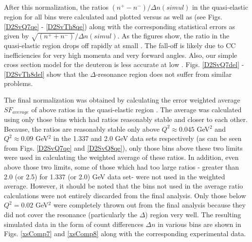 After this normalization, the ratios $(n^+ - n^-)/\Delta n(simul)$ in the quasi-elastic region for all \qsqs %
bins were calculated and plotted versus \qsqs as well as \ths %
(see Figs. \ref{D2SvQ7qe} - \ref{D2SvTh8qe})
along with the corresponding statistical errors as given by $\sqrt{(n^+ + n^-)}/\Delta n(simul)$. As the figures show, the ratio in the quasi-elastic region drops %
off rapidly at small \qsq. The fall-off is likely due to CC inefficiencies for very high momenta and very forward angles. Also, our simple cross section model for the deuteron is less accurate at low \qsq.  Figs. \ref{D2SvQ7del} - \ref{D2SvTh8del} show that the $\Delta$-resonance region does not suffer from similar problems. %


The final normalization was obtained by calculating the error weighted average $SF_{average}$ of above ratios in the quasi-elastic region%
. %
The average was calculated using only those \qsqs bins which had ratios reasonably stable and closer to each other. %
Because, the ratios are reasonably stable only above $Q^2\approx 0.045$ GeV$^2$ and $Q^2 \approx 0.09$ GeV$^2$ in the 1.337 and 2.0 GeV data sets respectively (as can be seen from Figs. \ref{D2SvQ7qe} and \ref{D2SvQ8qe}), only those \qsqs bins above these two limits were used in calculating the weighted average of these ratios. In addition, even above those two limits, some of those which had too large ratios - greater than 2.0 (or 2.5) for 1.337 (or 2.0) GeV data set-  were not used in the weighted average. However, it should be noted that the bins not used in the average ratio calculations were not entirely discarded from the final analysis. Only those below $Q^2=0.02$ GeV$^2$ were completely thrown out from the final analysis because they did not cover the resonance (particularly the $\Delta$) region very well.
The resulting simulated data in the form of count differences $\Delta n$ in various \qsqs bins are %
shown in Figs. \ref{xsComp7} and \ref{xsComp8} along with the corresponding experimental data. %


